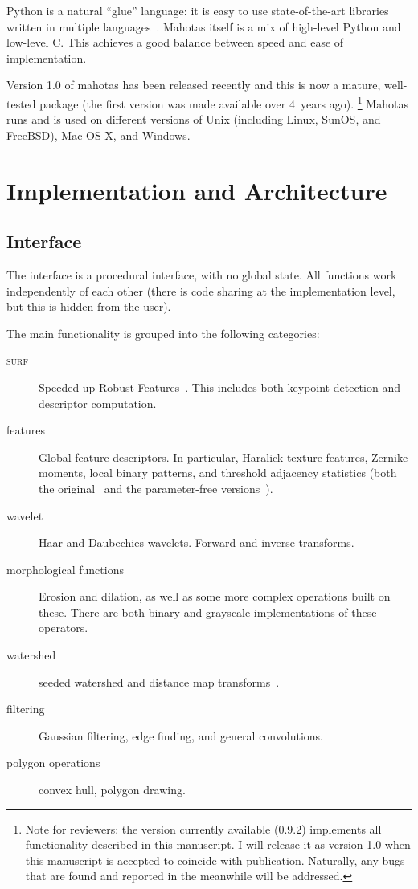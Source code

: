 \documentclass{article}
\newcommand*{\cpp}{{C\nolinebreak[4]\hspace{-.05em}\raisebox{.4ex}{\tiny\textbf{++}}}}
\begin{document}
Python is a natural ``glue'' language: it is easy to use state-of-the-art
libraries written in multiple languages~\citep{10.1109/MCSE.2007.58}. Mahotas
itself is a mix of high-level Python and low-level \cpp{}. This achieves a good
balance between speed and ease of implementation.

Version 1.0 of mahotas has been released recently and this is now a mature,
well-tested package (the first version was made available over 4~years ago).
\footnote{Note for reviewers: the version currently available (0.9.2)
implements all functionality described in this manuscript. I will release it as
version 1.0 when this manuscript is accepted to coincide with publication.
Naturally, any bugs that are found and reported in the meanwhile will be
addressed.} Mahotas runs and is used on different versions of Unix (including
Linux, SunOS, and FreeBSD), Mac OS X, and Windows.

\section{Implementation and Architecture}

\subsection{Interface}

The interface is a procedural interface, with no global state. All functions
work independently of each other (there is code sharing at the implementation
level, but this is hidden from the user).

The main functionality is grouped into the following categories:

\begin{description}
\item[\textsc{surf}] Speeded-up Robust Features~\citep{eth_biwi_00517}. This
includes both keypoint detection and descriptor computation.
\item[features] Global feature descriptors. In particular, Haralick texture
features, Zernike moments, local binary patterns, and threshold adjacency
statistics (both the original~\citep{Hamilton2007} and the parameter-free
versions~\citep{Coelho2010}).
\item[wavelet] Haar and Daubechies wavelets. Forward and inverse transforms.
\item[morphological functions] Erosion and dilation, as well as some more
complex operations built on these. There are both binary and grayscale
implementations of these operators.
\item[watershed] seeded watershed and distance map
transforms~\citep{felzenszwalb}.
\item[filtering] Gaussian filtering, edge finding, and general convolutions.
\item[polygon operations] convex hull, polygon drawing.
\end{description}
\end{document}
